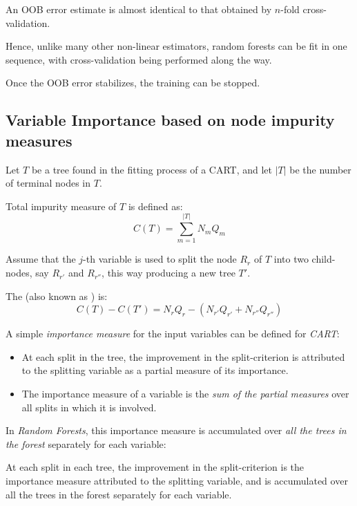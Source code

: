 An OOB error estimate is almost identical to that obtained by $n$-fold cross-validation.

Hence, unlike many other non-linear estimators, random forests can be fit in one sequence,
with cross-validation being performed along the way.

Once the OOB error stabilizes, the training can be stopped.

\subsection{Variable Importance based on node impurity measures}


Let $T$ be a tree found in the fitting process of a CART, and let
$|T|$ be the number of terminal nodes in $T$.

\begin{definition}{Total impurity measure}{} of $T$ is defined as:
	\begin{equation*}
		C(T) = \sum_{m=1}^{|T|} N_m Q_m
	\end{equation*}
\end{definition}

Assume that the $j$-th variable is used to split the node $R_r$ of $T$ into
two child-nodes, say $R_{r'}$ and $R_{r''}$, this way producing a new tree $T'$.

The  (also known as
) is:
\begin{equation*}
	C(T) - C(T') = N_r Q_r - \left(N_{r'} Q_{r'} + N_{r''} Q_{r''} \right)
\end{equation*}

A simple \emph{importance measure} for the input variables can be defined for
\emph{CART}:
\begin{itemize}
	\item At each split in the tree, the improvement in the split-criterion
	      is attributed to the splitting variable as a partial measure of its
	      importance.
	\item The importance measure of a variable is the \emph{sum of
		      the partial measures} over all splits in which it is involved.
\end{itemize}

In \emph{Random Forests}, this importance measure is accumulated over \emph{all the trees in the forest}
separately for each variable:

At each split in each tree, the improvement in the split-criterion
is the importance measure attributed to the splitting variable, and
is accumulated over all the trees in the forest separately for each variable.

